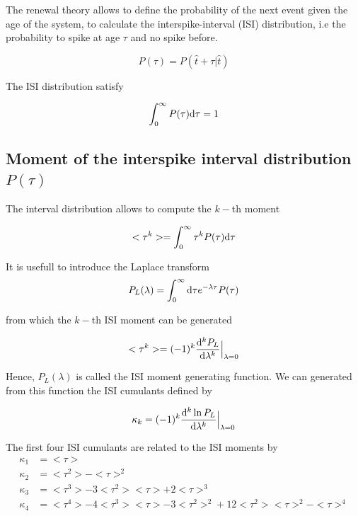 \documentclass[a4paper,11pt,twoside]{article}
\def \dd  {{\rm d}}
\numberwithin{equation}{section}
\begin{document}
The renewal theory allows to define the probability of the next event given the age of the system, to calculate the interspike-interval (ISI) distribution, i.e the probability to spike at age $\tau$ and no spike before.

\begin{equation}
\label{eq:P1}
P(\tau)=P(\hat{t}+\tau| \hat{t})
\end{equation}

The ISI distribution satisfy

\begin{equation}
\label{eq:Pnorm}
\int_0^\infty P(\tau)\dd\tau=1 
\end{equation}

\subsection{Moment of the interspike interval distribution $P(\tau)$}
The interval distribution allows to compute the $k-$th moment

\begin{equation}
\label{eq:Pmoment}
<\tau^k>=\int_0^\infty \tau^kP(\tau)\dd\tau
\end{equation}


It is usefull to introduce the Laplace transform
\begin{equation}
\label{eq:Plaplace}
P_L(\lambda)=\int_0^\infty\dd\tau e^{-\lambda \tau}P(\tau)
\end{equation}

from which the  $k-$th ISI moment can be generated

\begin{equation}
\label{eq:Pmoment2}
<\tau^k>=(-1)^k\frac{\dd^k P_L}{\dd \lambda^k}\Bigr|_{\lambda=0}
\end{equation}

Hence, $P_L(\lambda)$ is called the ISI moment generating function. We can generated from this function the ISI cumulants defined by

\begin{equation}
\label{eq:Pcumulant}
\kappa_k=(-1)^k\frac{\dd^k \ln P_L}{\dd \lambda^k}\Bigr|_{\lambda=0}
\end{equation}

The first four ISI cumulants are related to the ISI moments by
\begin{align}
\label{eq:kappa1234}
\kappa_1&=<\tau>\\
\kappa_2&=<\tau^2>-<\tau>^2\\
\kappa_3&=<\tau^3> -3<\tau^2><\tau>+2<\tau>^3\\
\kappa_4&=<\tau^4>-4<\tau^3><\tau>-3<\tau^2>^2+12<\tau^2><\tau>^2-<\tau>^4\\
\end{align}
\end{document}
